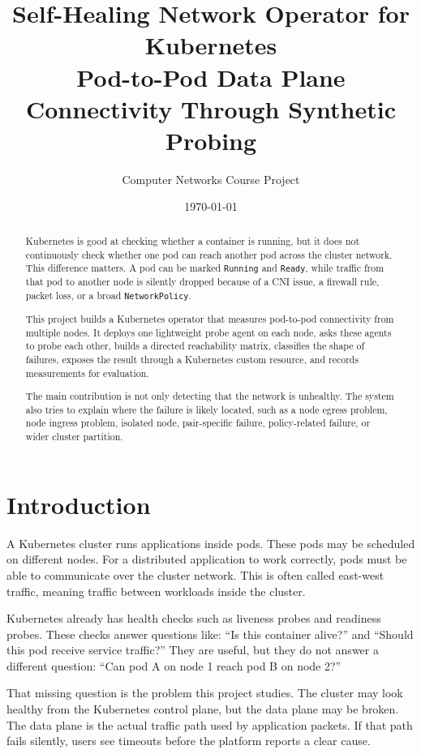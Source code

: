 \documentclass[11pt,a4paper]{article}
\title{\textbf{Self-Healing Network Operator for Kubernetes}\\
\large Pod-to-Pod Data Plane Connectivity Through Synthetic Probing}
\author{Computer Networks Course Project}
\date{\today}
\newcommand{\code}[1]{\texttt{#1}}
\begin{document}
\maketitle

\begin{abstract}
Kubernetes is good at checking whether a container is running, but it does not continuously check whether one pod can reach another pod across the cluster network. This difference matters. A pod can be marked \code{Running} and \code{Ready}, while traffic from that pod to another node is silently dropped because of a CNI issue, a firewall rule, packet loss, or a broad \code{NetworkPolicy}.

This project builds a Kubernetes operator that measures pod-to-pod connectivity from multiple nodes. It deploys one lightweight probe agent on each node, asks these agents to probe each other, builds a directed reachability matrix, classifies the shape of failures, exposes the result through a Kubernetes custom resource, and records measurements for evaluation.

The main contribution is not only detecting that the network is unhealthy. The system also tries to explain where the failure is likely located, such as a node egress problem, node ingress problem, isolated node, pair-specific failure, policy-related failure, or wider cluster partition.
\end{abstract}

\tableofcontents
\newpage

\section{Introduction}

A Kubernetes cluster runs applications inside pods. These pods may be scheduled on different nodes. For a distributed application to work correctly, pods must be able to communicate over the cluster network. This is often called east-west traffic, meaning traffic between workloads inside the cluster.

Kubernetes already has health checks such as liveness probes and readiness probes. These checks answer questions like: ``Is this container alive?'' and ``Should this pod receive service traffic?'' They are useful, but they do not answer a different question: ``Can pod A on node 1 reach pod B on node 2?''

That missing question is the problem this project studies. The cluster may look healthy from the Kubernetes control plane, but the data plane may be broken. The data plane is the actual traffic path used by application packets. If that path fails silently, users see timeouts before the platform reports a clear cause.
\end{document}
